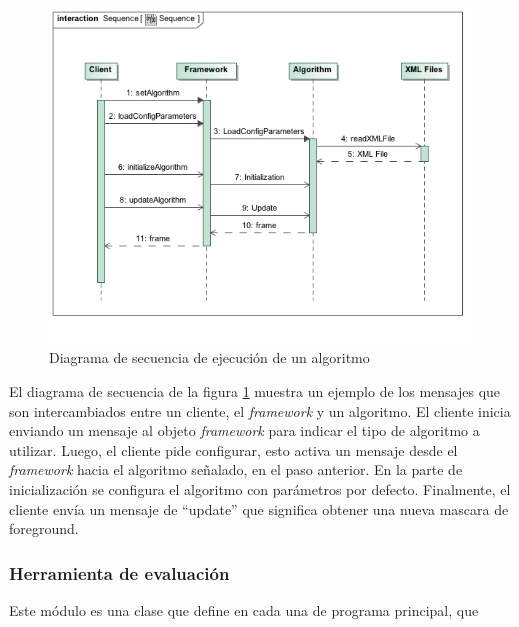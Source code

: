 \begin{figure}[h!]
\centering
\includegraphics[scale=0.5]{img/Sequence}
\caption[Diagrama de secuencia]{Diagrama de secuencia de ejecución de un algoritmo}
\label{fig:uml_sequence}
\end{figure}


El diagrama de secuencia de la figura \ref{fig:uml_sequence} muestra un ejemplo de los mensajes que son intercambiados entre un cliente, el \textit{framework} y un algoritmo. El cliente inicia enviando un mensaje al objeto \textit{framework} para indicar el tipo de algoritmo a utilizar. Luego, el cliente pide configurar, esto activa un mensaje desde el \textit{framework} hacia el algoritmo señalado, en el paso anterior. En la parte de inicialización se configura el algoritmo con parámetros por defecto. Finalmente, el cliente envía un mensaje de ``update'' que significa obtener una nueva mascara de foreground.


\subsubsection{Herramienta de evaluación}
Este módulo es una clase que define en cada una de  programa principal, que 